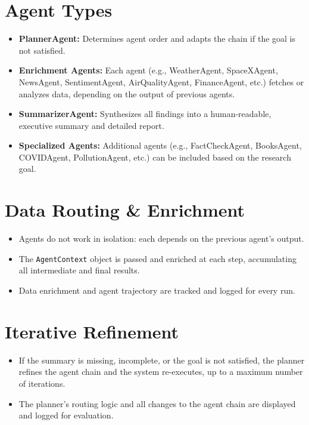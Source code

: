 \documentclass[12pt]{article}
\begin{document}
\section{Agent Types}

\begin{itemize}
    \item \textbf{PlannerAgent:} Determines agent order and adapts the chain if the goal is not satisfied.
    \item \textbf{Enrichment Agents:} Each agent (e.g., WeatherAgent, SpaceXAgent, NewsAgent, SentimentAgent, AirQualityAgent, FinanceAgent, etc.) fetches or analyzes data, depending on the output of previous agents.
    \item \textbf{SummarizerAgent:} Synthesizes all findings into a human-readable, executive summary and detailed report.
    \item \textbf{Specialized Agents:} Additional agents (e.g., FactCheckAgent, BooksAgent, COVIDAgent, PollutionAgent, etc.) can be included based on the research goal.
\end{itemize}

\section{Data Routing \& Enrichment}

\begin{itemize}
    \item Agents do not work in isolation: each depends on the previous agent’s output.
    \item The \texttt{AgentContext} object is passed and enriched at each step, accumulating all intermediate and final results.
    \item Data enrichment and agent trajectory are tracked and logged for every run.
\end{itemize}

\section{Iterative Refinement}

\begin{itemize}
    \item If the summary is missing, incomplete, or the goal is not satisfied, the planner refines the agent chain and the system re-executes, up to a maximum number of iterations.
    \item The planner’s routing logic and all changes to the agent chain are displayed and logged for evaluation.
\end{itemize}
\end{document}
